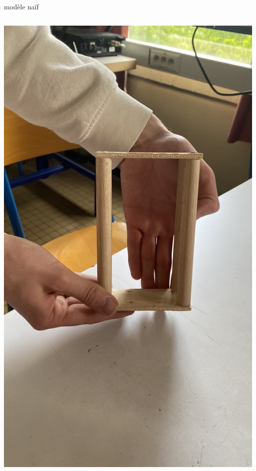 \documentclass{beamer}
\begin{document}
	\begin{frame}{modèle naïf}
		\begin{columns}
			\begin{column}{0.25\textwidth}
			\includegraphics[width=\textwidth]{Image/Modèle solide face échelle main.jpg}
			

\end{column}
\end{columns}
\end{frame}
\end{document}

